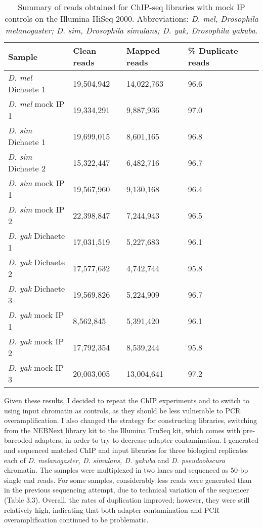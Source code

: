 \begin{table}[h]
\centering
\begin{tabular}{|l|l|l|l|}
\hline
\textbf{Sample}            & \textbf{Clean reads} & \textbf{Mapped reads} & \textbf{\% Duplicate reads} \\
\hline
\emph{D. mel} Dichaete 1 & 19,504,942  & 14,022,763   & 96.6               \\ \hline
\emph{D. mel} mock IP 1  & 19,334,291  & 9,887,936    & 97.0                 \\ \hline
\emph{D. sim} Dichaete 1 & 19,699,015  & 8,601,165    & 96.8               \\ \hline
\emph{D. sim} Dichaete 2 & 15,322,447  & 6,482,716    & 96.7               \\ \hline
\emph{D. sim} mock IP 1  & 19,567,960  & 9,130,168    & 96.4               \\ \hline
\emph{D. sim} mock IP 2  & 22,398,847  & 7,244,943    & 96.5               \\ \hline
\emph{D. yak} Dichaete 1 & 17,031,519  & 5,227,683    & 96.1               \\ \hline
\emph{D. yak} Dichaete 2 & 17,577,632  & 4,742,744    & 95.8               \\ \hline
\emph{D. yak} Dichaete 3 & 19,569,826  & 5,224,909    & 96.7               \\ \hline
\emph{D. yak} mock IP 1  & 8,562,845   & 5,391,420    & 96.1               \\ \hline
\emph{D. yak} mock IP 2  & 17,792,354  & 8,539,244    & 95.8               \\ \hline
\emph{D. yak} mock IP 3  & 20,003,005  & 13,004,641   & 97.2               \\ \hline
\end{tabular}
\caption{Summary of reads obtained for ChIP-seq libraries with mock IP controls on the Illumina HiSeq 2000. Abbreviations: \emph{D. mel, Drosophila melanogaster; D. sim, Drosophila simulans; D. yak, Drosophila yakuba}.}
\label{Table 3.2}
\end{table}

Given these results, I decided to repeat the ChIP experiments and to switch to using input chromatin as controls, as they should be less vulnerable to PCR overamplification. I also changed the strategy for constructing libraries, switching from the NEBNext library kit to the Illumina TruSeq kit, which comes with pre-barcoded adapters, in order to try to decrease adapter contamination. I generated and sequenced matched ChIP and input libraries for three biological replicates each of \emph{D. melanogaster, D. simulans, D. yakuba} and \emph{D. pseudoobscura} chromatin. The samples were multiplexed in two lanes and sequenced as 50-bp single end reads. For some samples, considerably less reads were generated than in the previous sequencing attempt, due to technical variation of the sequencer (Table 3.3). Overall, the rates of duplication improved; however, they were still relatively high, indicating that both adapter contamination and PCR overamplification continued to be problematic.

